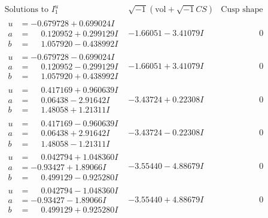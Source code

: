 \documentclass[1p]{elsarticle_modified}
\theoremstyle{definition}
\newcommand{\I}{\sqrt{-1}}
\begin{document}
$$\begin{array}{c|c|c}  
\text{Solutions to }I^u_{1}& \I (\text{vol} + \sqrt{-1}CS) & \text{Cusp shape}\\
 \hline 
\begin{aligned}
u &= -0.679728 + 0.699024 I \\
a &= \phantom{-}0.120952 + 0.299129 I \\
b &= \phantom{-}1.057920 - 0.438992 I\end{aligned}
 & -1.66051 - 3.41079 I & \phantom{-0.000000 } 0 \\ \hline\begin{aligned}
u &= -0.679728 - 0.699024 I \\
a &= \phantom{-}0.120952 - 0.299129 I \\
b &= \phantom{-}1.057920 + 0.438992 I\end{aligned}
 & -1.66051 + 3.41079 I & \phantom{-0.000000 } 0 \\ \hline\begin{aligned}
u &= \phantom{-}0.417169 + 0.960639 I \\
a &= \phantom{-}0.06438 - 2.91642 I \\
b &= \phantom{-}1.48058 + 1.21311 I\end{aligned}
 & -3.43724 + 0.22308 I & \phantom{-0.000000 } 0 \\ \hline\begin{aligned}
u &= \phantom{-}0.417169 - 0.960639 I \\
a &= \phantom{-}0.06438 + 2.91642 I \\
b &= \phantom{-}1.48058 - 1.21311 I\end{aligned}
 & -3.43724 - 0.22308 I & \phantom{-0.000000 } 0 \\ \hline\begin{aligned}
u &= \phantom{-}0.042794 + 1.048360 I \\
a &= -0.93427 + 1.89066 I \\
b &= \phantom{-}0.499129 - 0.925280 I\end{aligned}
 & -3.55440 - 4.88679 I & \phantom{-0.000000 } 0 \\ \hline\begin{aligned}
u &= \phantom{-}0.042794 - 1.048360 I \\
a &= -0.93427 - 1.89066 I \\
b &= \phantom{-}0.499129 + 0.925280 I\end{aligned}
 & -3.55440 + 4.88679 I & \phantom{-0.000000 } 0 \\ \hline\begin{aligned}

\end{aligned}
\end{array}$$
\end{document}
